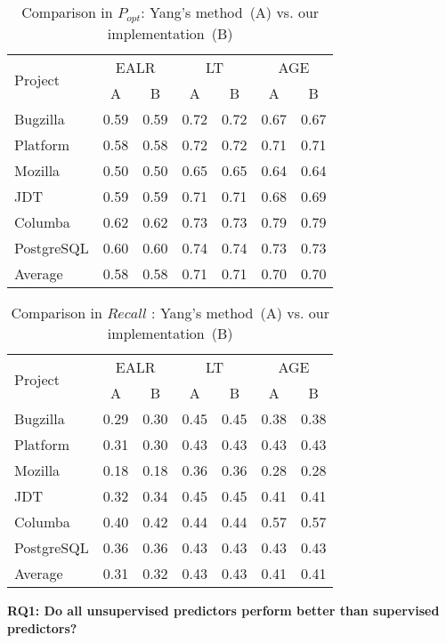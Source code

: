 \documentclass[sigconf]{acmart}
\theoremstyle{break}
\begin{document}
\begin{table}[!htp]
    \centering
    \caption{ Comparison in $P_{opt}$: Yang's method~(A) vs. our implementation~(B)}
    \begin{tabular}{l|c c| c c| c c}

    \hline
        \multirow{2}{*}{Project} &
        \multicolumn{2}{c|}{EALR} &
        \multicolumn{2}{c|}{LT} &\multicolumn{2}{c}{AGE} \\
        \cline{2-7}
        &A & B& A&B&A&B \\
        \hline
        Bugzilla & 0.59 & 0.59 &0.72 &  0.72& 0.67  & 0.67 \\
        Platform & 0.58 & 0.58 & 0.72 & 0.72 & 0.71 & 0.71\\
        Mozilla & 0.50 &0.50 &0.65 &0.65 &0.64&0.64\\
        JDT & 0.59 & 0.59& 0.71 &0.71 & 0.68  & 0.69\\
        Columba & 0.62 & 0.62& 0.73 & 0.73 & 0.79  & 0.79 \\
        PostgreSQL & 0.60 &0.60&0.74&0.74&0.73 &0.73\\ \hline
        Average & 0.58 & 0.58 & 0.71 & 0.71 & 0.70 &0.70 \\ \hline
    \end{tabular}
    \label{tab:comp_Popt}
\end{table}
\begin{table}[!htp]
    \centering
    \caption{Comparison in $Recall$ : Yang's method~(A) vs. our implementation~(B)}
    \begin{tabular}{l|c c| c c| c c}
    \hline
        \multirow{2}{*}{Project} &
        \multicolumn{2}{c|}{EALR} &
        \multicolumn{2}{c|}{LT} &\multicolumn{2}{c}{AGE} \\
        \cline{2-7}
        &A & B& A&B&A&B \\
        \hline
        Bugzilla & 0.29 & 0.30 &0.45 &  0.45& 0.38  & 0.38 \\
        Platform & 0.31 & 0.30 & 0.43 & 0.43 & 0.43 & 0.43\\
        Mozilla & 0.18 &0.18 &0.36 &0.36 &0.28&0.28\\
        JDT & 0.32 & 0.34& 0.45 &0.45 & 0.41  & 0.41\\
        Columba & 0.40 & 0.42& 0.44 & 0.44 & 0.57  & 0.57 \\
        PostgreSQL & 0.36 &0.36&0.43&0.43&0.43 &0.43\\ \hline
        Average & 0.31 & 0.32 & 0.43 & 0.43 & 0.41 & 0.41 \\ \hline
    \end{tabular}
    \label{tab:comp_Recall}
\end{table}
\textbf{RQ1: Do all unsupervised predictors perform better than supervised predictors?}
\end{document}
